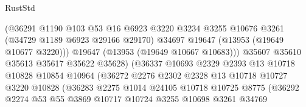 \begin{lexlean}{RustStd}
\begin{coremodule}
                                    (@36291
                                      @1190
                                      @103
                                      @53
                                      @16
                                      @6923
                                      @3220
                                      @3234
                                      @3255
                                      @10676
                                      @3261
                                      (@34729 @1189 @6923 @29166 @29170)
                                      @34697
                                      @19647
                                      (@13953 (@19649 @10677 @3220)))
                                    @19647
                                    (@13953 (@19649 @10667 @10683)))
                                  @35607
                                  @35610
                                  @35613
                                  @35617
                                  @35622
                                  @35628)
                                (@36337
                                  @10693
                                  @2329
                                  @2393
                                  @13
                                  @10718
                                  @10828
                                  @10854
                                  @10964
                                  (@36272
                                    @2276
                                    @2302
                                    @2328
                                    @13
                                    @10718
                                    @10727
                                    @3220
                                    @10828
                                    (@36283
                                      @2275
                                      @1014
                                      @24105
                                      @10718
                                      @10725
                                      @8775
                                      (@36292
                                        @2274
                                        @53
                                        @55
                                        @3869
                                        @10717
                                        @10724
                                        @3255
                                        @10698
                                        @3261
                                        @34769

\end{coremodule}
\end{lexlean}
